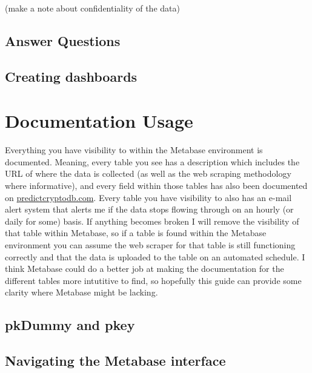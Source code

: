 \documentclass[]{book}
\begin{document}
(make a note about confidentiality of the data)

\hypertarget{answer-questions}{%
\section{Answer Questions}\label{answer-questions}}

\hypertarget{creating-dashboards}{%
\section{Creating dashboards}\label{creating-dashboards}}

\hypertarget{documentation-usage}{%
\chapter{Documentation Usage}\label{documentation-usage}}

Everything you have visibility to within the Metabase environment is documented. Meaning, every table you see has a description which includes the URL of where the data is collected (as well as the web scraping methodology where informative), and every field within those tables has also been documented on \href{https://predictcryptodb.com}{predictcryptodb.com}. Every table you have visibility to also has an e-mail alert system that alerts me if the data stops flowing through on an hourly (or daily for some) basis. If anything becomes broken I will remove the visibility of that table within Metabase, so if a table is found within the Metabase environment you can assume the web scraper for that table is still functioning correctly and that the data is uploaded to the table on an automated schedule. I think Metabase could do a better job at making the documentation for the different tables more intutitive to find, so hopefully this guide can provide some clarity where Metabase might be lacking.

\hypertarget{pkdummy-and-pkey}{%
\section{pkDummy and pkey}\label{pkdummy-and-pkey}}

\hypertarget{navigating-the-metabase-interface}{%
\section{Navigating the Metabase interface}\label{navigating-the-metabase-interface}}
\end{document}
